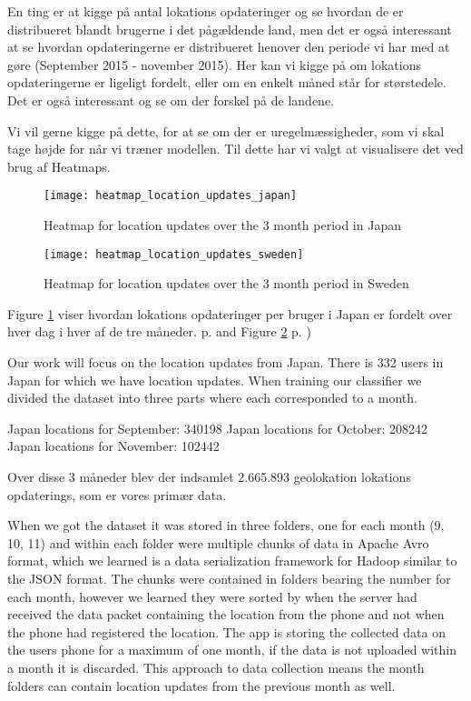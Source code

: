 En ting er at kigge på antal lokations opdateringer og se hvordan de er distribueret blandt brugerne i det pågældende land, men det er også interessant at se hvordan opdateringerne er distribueret henover den periode vi har med at gøre (September 2015 - november 2015). Her kan vi kigge på om lokations opdateringerne er ligeligt fordelt, eller om en enkelt måned står for størstedele. Det er også interessant og se om der forskel på de landene. 

Vi vil gerne kigge på dette, for at se om der er uregelmæssigheder, som vi skal tage højde for når vi træner modellen. 
 Til dette har vi valgt at visualisere det ved brug af Heatmaps. 
\begin{figure}[H]
    \centering
    \texttt{[image: heatmap\_location\_updates\_japan]}
    \caption{Heatmap for location updates over the 3 month period in Japan}
    \label{fig:heatmap_jap}
\end{figure}


\begin{figure}[H]
    \centering
    \texttt{[image: heatmap\_location\_updates\_sweden]}
    \caption{Heatmap for location updates over the 3 month period in Sweden}
    \label{fig:heatmap_swe}
\end{figure}


 Figure \ref{fig:heatmap_jap} viser hvordan lokations opdateringer per bruger i Japan er fordelt over hver dag i hver af de tre måneder. p.  \pageref{fig:heatmap_jap} and Figure \ref{fig:heatmap_swe} p. \pageref{fig:heatmap_swe})


Our work will focus on the location updates from Japan. There is 332 users in Japan for which we have location updates.
When training our classifier we divided the dataset into three parts where each corresponded to a month.

Japan locations for September: 340198
Japan locations for October: 208242
Japan locations for November: 102442



Over disse 3 måneder blev der indsamlet 2.665.893 geolokation lokations opdaterings, som er vores primær data. 

When we got the dataset it was stored in three folders, one for each month (9, 10, 11) and within each folder were multiple chunks of data in Apache Avro format\cite{apacheavro}, which we learned is a data serialization framework for Hadoop similar to the JSON format. The chunks were contained in folders bearing the number for each month, however we learned they were sorted by when the server had received the data packet containing the location from the phone and not when the phone had registered the location. The app is storing the collected data on the users phone for a maximum of one month, if the data is not uploaded within a month it is discarded. This approach to data collection means the month folders can contain location updates from the previous month as well.


